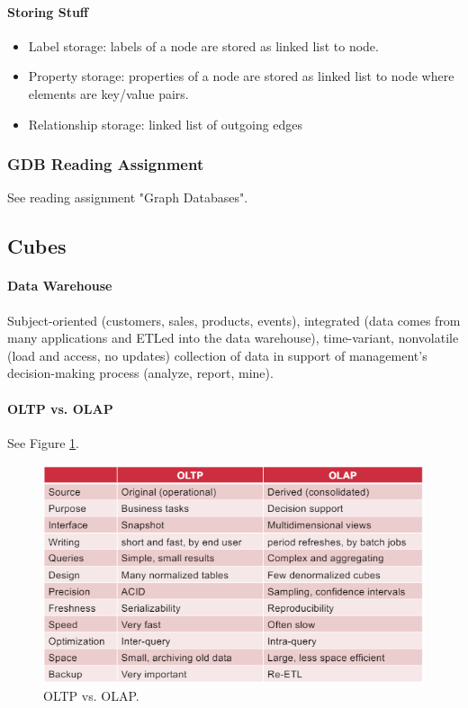 \paragraph{Storing Stuff}
\begin{itemize}
    \item Label storage: labels of a node are stored as linked list to node.
    \item Property storage: properties of a node are stored as linked list to node where elements are key/value pairs.
    \item Relationship storage: linked list of outgoing edges %
\end{itemize}



\subsubsection{GDB Reading Assignment}

See reading assignment "Graph Databases".








\subsection{Cubes}

\paragraph{Data Warehouse}
Subject-oriented (customers, sales, products, events), integrated (data comes from many applications and ETLed into the data warehouse), time-variant, nonvolatile (load and access, no updates) collection of data in support of management's decision-making process (analyze, report, mine).


\paragraph{OLTP vs. OLAP}
See Figure \ref{fig:ovso}.

\begin{figure}[h]
	\centering
	\includegraphics[scale=0.7]{images/3-ovso.PNG}
	\caption{OLTP vs. OLAP.}
	\label{fig:ovso}
\end{figure}

